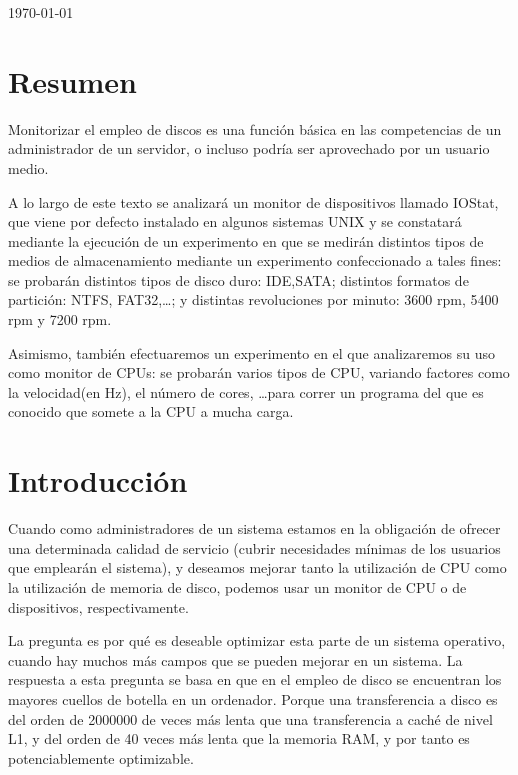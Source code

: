 \documentclass[a4paper,10pt]{article}
\newcommand{\imagent}[5]{
  \begin{figure}
    \begin{center}
    \texttt{[image: \#1]}
    \end{center}
    \caption{#3}
    \label{#4}
  \end{figure}
}
\newcommand{\imagen}[4]{
  \begin{minipage}{\linewidth}
    \centering
    \texttt{[image: \#1]}
    \captionof{figure}{#2}
    \label{#3}
  \end{minipage} 
}
\renewcommand{\texttt}[2][black!60]{\textcolor{#1}{\ttfamily #2}}
\begin{document}
\begin{titlepage}
\vspace{\fill}%
\large\today
\end{titlepage}  

\newpage
\thispagestyle{empty}
\tableofcontents
\newpage
\setcounter{page}{1}


\section{Resumen}
Monitorizar el empleo de discos es una función básica en las competencias de un administrador de un servidor, o incluso
podría ser aprovechado por un usuario medio.

A lo largo de este texto se analizará un monitor de dispositivos llamado \texttt{IOStat}, que viene por defecto instalado
en algunos sistemas UNIX y se constatará mediante la ejecución de un experimento en que se medirán distintos tipos de medios 
de almacenamiento mediante un experimento confeccionado a tales fines: se probarán distintos tipos de disco
duro: IDE,SATA; distintos formatos de partición: NTFS, FAT32,\ldots; y distintas revoluciones por minuto: 3600 rpm, 5400 rpm y 7200 rpm.

Asimismo, también efectuaremos un experimento en el que analizaremos su uso como monitor de CPUs: se probarán varios
tipos de CPU, variando factores como la velocidad(en Hz), el número de cores, \ldots para correr un programa del que es
conocido que somete a la CPU a mucha carga.
\section{Introducción}
Cuando como administradores de un sistema estamos en la obligación de ofrecer una determinada calidad de servicio (cubrir
necesidades mínimas de los usuarios que emplearán el sistema), y deseamos mejorar tanto la utilización de CPU como la utilización de 
memoria de disco, podemos usar un monitor de CPU o de dispositivos, respectivamente.

La pregunta es por qué es deseable optimizar esta parte de un sistema operativo, cuando hay muchos más campos que se pueden
mejorar en un sistema. La respuesta a esta pregunta se basa en que en el empleo de disco se encuentran los mayores cuellos de
botella en un ordenador. Porque una transferencia a  disco es del orden de 2000000 de veces más lenta que una transferencia a
caché de nivel L1, y del orden de 40 veces más lenta que la memoria RAM, y por tanto es potenciablemente optimizable. \cite{conferencia}
\end{document}
